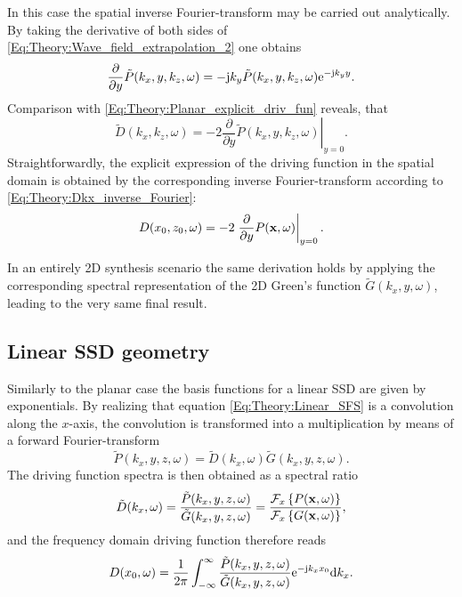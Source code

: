 \vspace{3mm}
In this case the spatial inverse Fourier-transform may be carried out analytically.
By taking the derivative of both sides of \eqref{Eq:Theory:Wave_field_extrapolation_2} one obtains
\begin{equation}
\frac{\partial}{\partial y}  \tilde{P}(k_x,y,k_z,\omega) = - \mathrm{j} k_y  \tilde{P}(k_x,y,k_z,\omega) \mathrm{e}^{-\mathrm{j} k_y y}.
\end{equation}
Comparison with \eqref{Eq:Theory:Planar_explicit_driv_fun} reveals, that 
\begin{equation}
\tilde{D}(k_x,k_z,\omega) = -2 \left. \frac{\partial}{\partial y} \tilde{P}(k_x,y,k_z,\omega) \right|_{y = 0}.
\label{Eq:Theory:Planar_explicit_driv_fun_spatial}
\end{equation}
Straightforwardly, the explicit expression of the driving function in the spatial domain is obtained by the corresponding inverse Fourier-transform according to \eqref{Eq:Theory:Dkx_inverse_Fourier}:
\begin{equation}
D(x_0,z_0,\omega) = -2 \left. \frac{\partial}{\partial y} P(\mathbf{x},\omega) \right|_{y = 0}.
\label{Eq:Theory:Planar_explicit_driv_fun_spatial}
\end{equation}

In an entirely 2D synthesis scenario the same derivation holds by applying the corresponding spectral representation of the 2D Green's function $\tilde{G}(k_x,y,\omega)$, leading to the very same final result.

\subsection{Linear SSD geometry}

Similarly to the planar case the basis functions for a linear SSD are given by exponentials.
By realizing that equation \eqref{Eq:Theory:Linear_SFS} is a convolution along the $x$-axis,
the convolution is transformed into a multiplication by means of a forward Fourier-transform
\begin{equation}
\tilde{P}(k_x,y,z, \omega) = \tilde{D}(k_x,\omega)\tilde{G}(k_x,y,z, \omega).
\end{equation}
The driving function spectra is then obtained as a spectral ratio
\begin{equation}
\tilde{D}(k_x,\omega) = \frac{\tilde{P}(k_x,y,z, \omega)}{\tilde{G}(k_x,y,z, \omega)} = \frac{\mathcal{F}_x\left\{ P(\mathbf{x},\omega) \right\}}{\mathcal{F}_x\left\{ G(\mathbf{x},\omega) \right\}},
\end{equation}
and the frequency domain driving function therefore reads
\begin{equation}
D(x_0,\omega) = \frac{1}{2\pi} \int_{-\infty}^{\infty} \frac{\tilde{P}(k_x,y,z, \omega) }{\tilde{G}(k_x,y,z, \omega)} \mathrm{e}^{-\mathrm{j} k_x x_0} \mathrm{d} k_x.
\label{Eq:Theory:LinearSDM1}
\end{equation}

